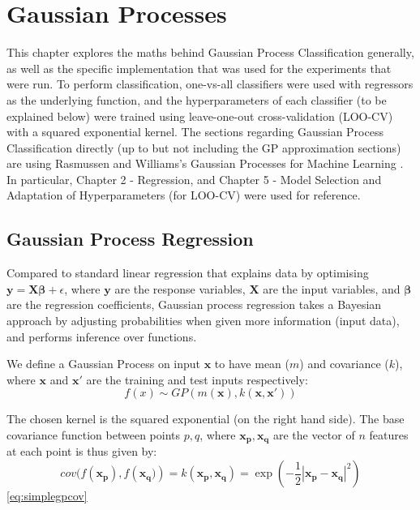 \chapter{Gaussian Processes} \label{chap:gps}

This chapter explores the maths behind Gaussian Process Classification generally, as well as the specific implementation that was used for the experiments that were run. To perform classification, one-vs-all classifiers were used with regressors as the underlying function, and the hyperparameters of each classifier (to be explained below) were trained using leave-one-out cross-validation (LOO-CV) with a squared exponential kernel. The sections regarding Gaussian Process Classification directly (up to but not including the GP approximation sections) are using Rasmussen and Williams's Gaussian Processes for Machine Learning \citep{rasmussen06}. In particular, Chapter 2 - Regression, and Chapter 5 - Model Selection and Adaptation of Hyperparameters (for LOO-CV) were used for reference.


\section{Gaussian Process Regression}

Compared to standard linear regression that explains data by optimising $\mathbf{y=X\beta} + \epsilon$, where $\mathbf{y}$ are the response variables, $\mathbf{X}$ are the input variables, and $\mathbf{\beta}$ are the regression coefficients, Gaussian process regression takes a Bayesian approach by adjusting probabilities when given more information (input data), and performs inference over functions.

We define a Gaussian Process on input $\mathbf{x}$ to have mean ($m$) and covariance ($k$), where $\mathbf{x}$ and $\mathbf{x'}$ are the training and test inputs respectively:
\begin{equation}
f(x) \sim GP(m(\mathbf{x}), k(\mathbf{x}, \mathbf{x'}))
\end{equation}

The chosen kernel is the squared exponential (on the right hand side). The base covariance function between points $p, q$, where $\mathbf{x_p, x_q}$ are the vector of $n$ features at each point is thus given by:
\begin{equation}\label{eq:simplegpcov}
    cov(f(\mathbf{x_p}), f(\mathbf{x_q)}) = k(\mathbf{x_p, x_q}) = \exp(-\frac{1}{2}|\mathbf{x_p}-\mathbf{x_q}|^2)
\end{equation}
\eqref{eq:simplegpcov}


